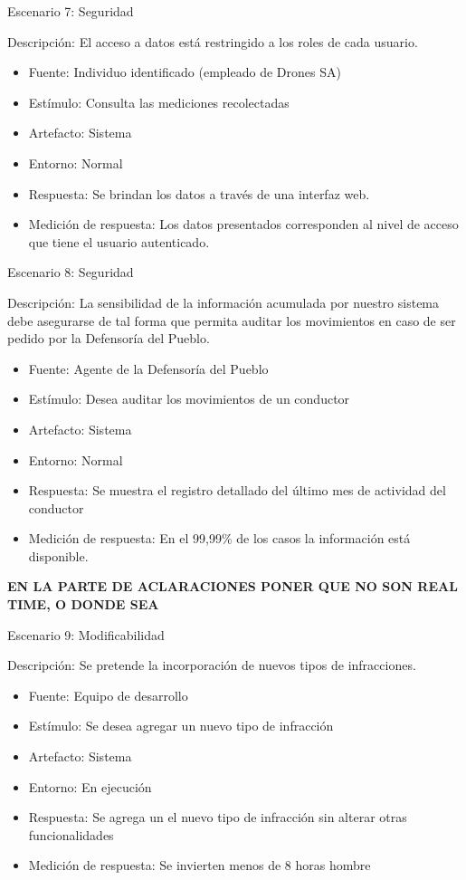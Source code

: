 Escenario 7: Seguridad


Descripción: El acceso a datos está restringido a los roles de cada usuario.
\begin{itemize}
\item Fuente: Individuo identificado (empleado de Drones SA)
\item Estímulo: Consulta las mediciones recolectadas
\item Artefacto: Sistema
\item Entorno: Normal
\item Respuesta: Se brindan los datos a través de una interfaz web. 
\item Medición de respuesta: Los datos presentados corresponden al nivel de acceso que tiene el usuario autenticado.
\end{itemize} 

Escenario 8: Seguridad


Descripción: La sensibilidad de la información acumulada por nuestro sistema debe asegurarse de tal forma que permita auditar los movimientos en caso de ser pedido por la Defensoría del Pueblo.
\begin{itemize}
\item Fuente: Agente de la Defensoría del Pueblo
\item Estímulo: Desea auditar los movimientos de un conductor
\item Artefacto: Sistema
\item Entorno: Normal
\item Respuesta: Se muestra el registro detallado del último mes de actividad del conductor
\item Medición de respuesta: En el 99,99\% de los casos la información está disponible.
\end{itemize}
\textbf{EN LA PARTE DE ACLARACIONES PONER QUE NO SON REAL TIME, O DONDE SEA}

Escenario 9: Modificabilidad


Descripción: Se pretende la incorporación de nuevos tipos de infracciones.
\begin{itemize}
\item Fuente: Equipo de desarrollo
\item Estímulo: Se desea agregar un nuevo tipo de infracción
\item Artefacto: Sistema
\item Entorno: En ejecución
\item Respuesta: Se agrega un el nuevo tipo de infracción sin alterar otras funcionalidades 
\item Medición de respuesta: Se invierten menos de 8 horas hombre
\end{itemize} 

